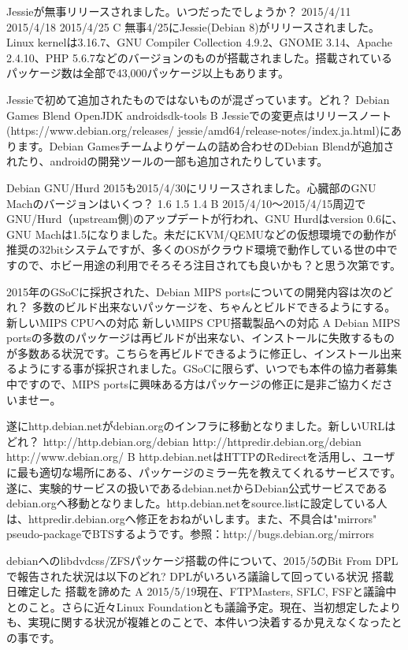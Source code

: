 %

\santaku
{Jessieが無事リリースされました。いつだったでしょうか？}
{2015/4/11}
{2015/4/18}
{2015/4/25}
{C}
{無事4/25にJessie(Debian 8)がリリースされました。Linux kernelは3.16.7、GNU Compiler Collection 4.9.2、GNOME 3.14、Apache 2.4.10、PHP 5.6.7などのバージョンのものが搭載されました。搭載されているパッケージ数は全部で43,000パッケージ以上もあります。}

\santaku
{Jessieで初めて追加されたものではないものが混ざっています。どれ？}
{Debian Games Blend}
{OpenJDK}
{androidsdk-tools}
{B}
{Jessieでの変更点はリリースノート(https://www.debian.org/releases/ jessie/amd64/release-notes/index.ja.html)にあります。Debian Gamesチームよりゲームの詰め合わせのDebian Blendが追加されたり、androidの開発ツールの一部も追加されたりしています。}

\santaku
{Debian GNU/Hurd 2015も2015/4/30にリリースされました。心臓部のGNU Machのバージョンはいくつ？}
{1.6}
{1.5}
{1.4}
{B}
{2015/4/10〜2015/4/15周辺でGNU/Hurd（upstream側)のアップデートが行われ、GNU Hurdはversion 0.6に、GNU Machは1.5になりました。未だにKVM/QEMUなどの仮想環境での動作が推奨の32bitシステムですが、多くのOSがクラウド環境で動作している世の中ですので、ホビー用途の利用でそろそろ注目されても良いかも？と思う次第です。}

\santaku
{2015年のGSoCに採択された、Debian MIPS portsについての開発内容は次のどれ？}
{多数のビルド出来ないパッケージを、ちゃんとビルドできるようにする。}
{新しいMIPS CPUへの対応}
{新しいMIPS CPU搭載製品への対応}
{A}
{Debian MIPS portsの多数のパッケージは再ビルドが出来ない、インストールに失敗するものが多数ある状況です。こちらを再ビルドできるように修正し、インストール出来るようにする事が採択されました。GSoCに限らず、いつでも本件の協力者募集中ですので、MIPS portsに興味ある方はパッケージの修正に是非ご協力くださいませー。}

\santaku
{遂にhttp.debian.netがdebian.orgのインフラに移動となりました。新しいURLはどれ？}
{http://http.debian.org/debian}
{http://httpredir.debian.org/debian}
{http://www.debian.org/}
{B}
{http.debian.netはHTTPのRedirectを活用し、ユーザに最も適切な場所にある、パッケージのミラー先を教えてくれるサービスです。遂に、実験的サービスの扱いであるdebian.netからDebian公式サービスであるdebian.orgへ移動となりました。http.debian.netをsource.listに設定している人は、httpredir.debian.orgへ修正をおねがいします。また、不具合は"mirrors" pseudo-packageでBTSするようです。参照：http://bugs.debian.org/mirrors　}

\santaku
{debianへのlibdvdcss/ZFSパッケージ搭載の件について、2015/5のBit From DPLで報告された状況は以下のどれ?}
{DPLがいろいろ議論して回っている状況}
{搭載日確定した}
{搭載を諦めた}
{A}
{2015/5/19現在、FTPMasters, SFLC, FSFと議論中とのこと。さらに近々Linux Foundationとも議論予定。現在、当初想定したよりも、実現に関する状況が複雑とのことで、本件いつ決着するか見えなくなったとの事です。}

